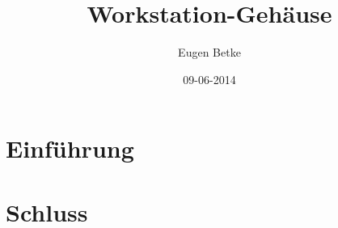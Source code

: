 \documentclass[a4paper,10pt,twoside,notitlepage,twocolumn]{article}
\author{Eugen Betke}
\title{Workstation-Geh\"ause}
\date{09-06-2014}
\begin{document}
\maketitle
\section{Einführung}

\section{Schluss}



\end{document}
